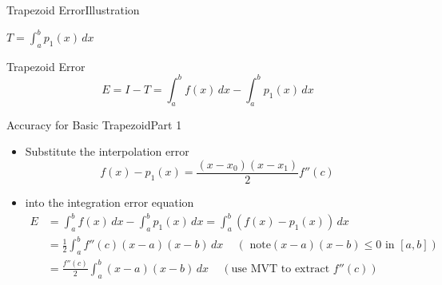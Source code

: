 \documentclass[10pt]{beamer}
\begin{document}
\begin{frame}{Trapezoid Error}{Illustration}
{\begin{center}
     $T = \int_a^b p_1(x)\,dx$\\
    \end{center}
    }
\vspace{5mm}
   \begin{block}{Trapezoid Error}
        $$E = I - T = \int_a^b f(x)\,dx - \int_a^b p_1(x)\,dx $$
   \end{block}

\end{frame}


\begin{frame}{Accuracy for Basic Trapezoid}{Part 1}
\begin{itemize}
    \item Substitute the interpolation error 
            $$f(x) - p_1 (x) = \frac{(x-x_0)(x-x_1)}{2} f''(c)$$
    \item into the integration error equation
        \begin{align*}
          E &= \int_a^b f(x)\,dx - \int_a^b p_1(x) \,dx =  \int_a^b(f(x) - p_1(x))\,dx \\
            &= \frac{1}{2}\int_a^b f''(c) (x-a)(x-b) \,dx \,\quad  ( \text{ note} (x-a)(x-b) \leq 0 \text{ in } [a,b])\\
            &= \frac{f''(c)}{2}\int_a^b  (x-a)(x-b) \,dx \,\quad (\text{use MVT to extract }f''(c))         
            \end{align*}
\end{itemize}
\end{frame}
\end{document}
